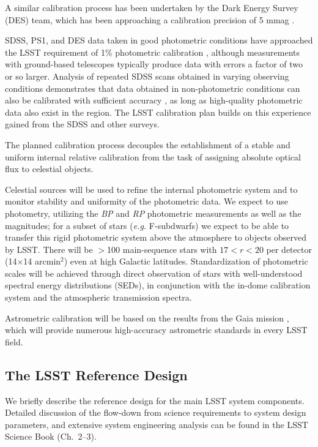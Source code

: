 A similar calibration process has been undertaken by the Dark Energy
Survey (DES) team, which has been approaching a calibration
precision of 5 mmag \citep{2018AJ....155...41B}.

SDSS, PS1, and DES data
taken in good photometric conditions have approached the LSST
requirement of 1\% photometric calibration
\citep{2008ApJ...674.1217P,2012ApJ...756..158S,2018AJ....155...41B}, although measurements with ground-based telescopes
typically produce data with errors a factor of two or so larger. Analysis of
repeated SDSS scans obtained in varying observing conditions demonstrates that data
obtained in
non-photometric conditions can also be calibrated with
sufficient accuracy \citep{2007AJ....134..973I}, as long as high-quality
photometric data also exist in the region.
The LSST calibration plan builds on this experience gained from the SDSS and other surveys.

The planned calibration process decouples the establishment of a stable and uniform internal
relative calibration from the task of assigning absolute optical flux to
celestial objects.

Celestial sources will be used to refine the internal photometric system and
to monitor stability and uniformity of the photometric data. We expect to use \citet{2016A&A...595A...2G} photometry, utilizing
the \textit{BP} and \textit{RP} photometric measurements as well as the  magnitudes; for a subset
of stars (\textit{e.g.} F-subdwarfs) we expect to be able to transfer this rigid photometric system above
the atmosphere to objects observed by LSST.
There will be
$>$100 main-sequence stars with $17<r<20$ per detector (14$\times$14 arcmin$^2$)
even at high Galactic latitudes. Standardization of photometric scales will be
achieved through direct observation of stars with well-understood spectral
energy distributions (SEDs), in conjunction with the in-dome calibration system and the atmospheric transmission spectra.

Astrometric calibration will be based on the results from the Gaia mission \citep{2018A&A...616A...2L}, which will provide
numerous high-accuracy astrometric standards in every LSST field.

\subsection{The LSST  Reference Design}

We briefly describe the reference design for the main LSST system components.
Detailed discussion of the flow-down from science requirements to system
design parameters, and extensive system engineering analysis can be
found in the LSST Science Book (Ch.~2--3).

